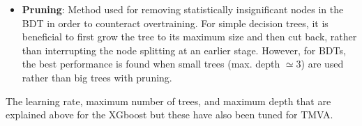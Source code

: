 \begin{itemize}
	 
	
	\item \textbf{Pruning}: 
		Method used for removing statistically insignificant nodes
		in the BDT in order to counteract overtraining.
		For simple decision trees, it is beneficial to first grow the tree to its
		maximum size and then cut back, rather than interrupting the node splitting at an earlier stage.
		However, for BDTs, the best performance is found when small trees (max. depth $\simeq 3$) are
		used rather than big trees with pruning.
\end{itemize}
The learning rate, maximum number of trees, and maximum depth that are explained above 
for the XGboost but these have also been tuned for TMVA.






